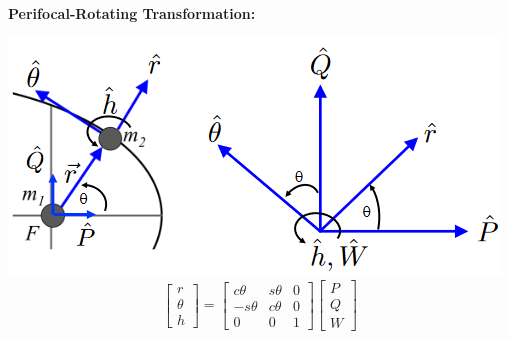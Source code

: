 \documentclass{article}
\begin{document}
\begin{multicols*}{3}
    \textbf{Perifocal-Rotating Transformation:}\par 
    \includegraphics[width=\linewidth]{Figures/peri-rot.png}
    \begin{equation*}
        \begin{bmatrix}
            r\\
            \theta\\
            h
        \end{bmatrix}
        =
        \begin{bmatrix}
            c\theta & s\theta & 0\\
            -s\theta & c\theta & 0\\
            0 & 0 & 1
        \end{bmatrix}
        \begin{bmatrix}
            P\\
            Q\\
            W
        \end{bmatrix}
    \end{equation*}


\end{multicols*}
\end{document}
